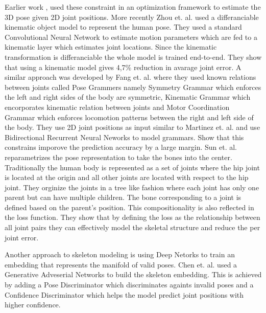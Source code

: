 Earlier work \parencite{barron2001estimating}, \parencite{wei2009modeling} used these constraint in an optimization framework to estimate the 3D pose given 2D joint positions. More recently Zhou et. al. \parencite{zhou2016deep} used a differanciable kinematic object model to represent the human pose. They used a standard Convolutional Neural Network to estimate motion parameters which are fed to a kinematic layer which estimates joint locations. Since the kinematic transformation is differanciable the whole model is trained end-to-end. They show that using a kinematic model gives 4,7\% reduction in avarage joint error. A similar approach was developed by Fang et. al. \parencite{fang2018learning} where they used known relations between joints called Pose Grammers namely Symmetry Grammar which enforces the left and right sides of the body are symmetric, Kinematic Grammar which encorporates kinematic relation between joints and Motor Coordination Grammar which enforces locomotion patterns between the right and left side of the body. They use 2D joint positions as input similar to Martinez et. al. \parencite{martinez2017simple} and use Bidirectional Recurrent Neural Neworks \parencite{schuster1997bidirectional} to model grammars. Show that this constrains imporove the prediction accuracy by a large margin. Sun et. al. \parencite{sun2017compositional} reparametrizes the pose representation to take the bones into the center. Traditionally the human body is represented as a set of joints where the hip joint is located at the origin and all other joints are located with respect to the hip joint. They orginize the joints in a tree like fashion where each joint has only one parent but can have multiple children. The bone corresponding to a joint is defined based on the parent's position. This compositionality is also reflected in the loss function. They show that by defining the loss as the relationship between all joint pairs they can effectively model the skeletal structure and reduce the per joint error. 

Another approach to skeleton modeling is using Deep Netorks to train an embedding that represents the manifold of valid poses. Chen et. al. \parencite{chen2017adversarial} used a Generative Adveserial Networks \parencite{goodfellow2014generative} to build the skeleton embedding. This is achieved by adding a Pose Discriminator which discriminates againts invalid poses and a Confidence Discriminator which helps the model predict joint positions with higher confidence. 


